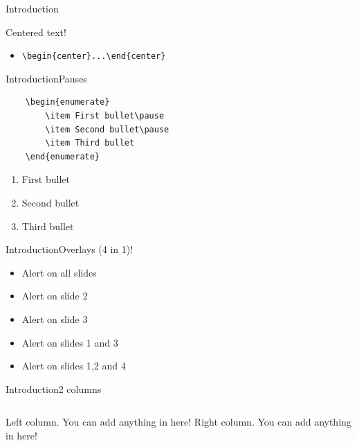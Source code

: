 \documentclass[hyperref={pdfpagelabels=false}]{beamer}
\begin{document}
\begin{frame}[fragile]{Introduction}
\begin{center}Centered text!\end{center}
\begin{itemize}
    \item \verb+\begin{center}...\end{center}+ 
\end{itemize}
\end{frame}	

\begin{frame}[fragile]{Introduction}{Pauses}
\begin{verbatim}
    \begin{enumerate}
        \item First bullet\pause
        \item Second bullet\pause
        \item Third bullet
    \end{enumerate}
\end{verbatim}
    \begin{enumerate}
        \item First bullet\pause
        \item Second bullet\pause
        \item Third bullet
    \end{enumerate}
\end{frame}

\begin{frame}{Introduction}{Overlays (4 in 1)!} 
\begin{itemize}
		\item \alert{Alert on all slides}
		\item \alert<2>{Alert on slide 2}
		\item \alert<3>{Alert on slide 3}
		\item \alert<1,3>{Alert on slides 1 and 3}
		\item \alert<-2,4>{Alert on slides 1,2 and 4}
\end{itemize}
\end{frame}


\begin{frame}{Introduction}{2 columns}
\begin{columns}
Left column. You can add anything in here!
Right column. You can add anything in here!
\end{columns}
\end{frame}
\end{document}
